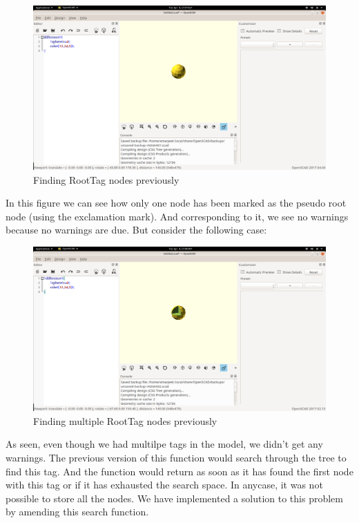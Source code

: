 \begin{figure}
	\centering
	\includegraphics[width=\linewidth]{images/output/before_okay.png}
	\caption{Finding RootTag nodes previously}
\end{figure}
In this figure we can see how only one node has been marked as the pseudo root node (using the exclamation mark). And corresponding to it, we see no warnings because no warnings are due. But consider the following case:\\
\begin{figure}
	\centering
	\includegraphics[width=\linewidth]{images/output/before_wrong.png}
	\caption{Finding multiple RootTag nodes previously}
\end{figure}
As seen, even though we had multilpe tags in the model, we didn't get any warnings.
The previous version of this function would search through the tree to find this tag. And the function would return as soon as it has found the first node with this tag or if it has exhausted the search space. In anycase, it was not possible to store all the nodes. We have implemented a solution to this problem by amending this search function.\\
